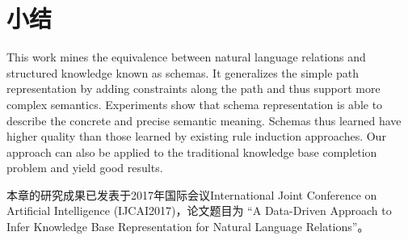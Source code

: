 \section{小结}
This work mines the equivalence between natural language relations and structured 
knowledge known as schemas.  It generalizes the simple path representation 
by adding constraints along the path and thus support more complex semantics.
Experiments show that schema representation is able to describe the concrete 
and precise semantic meaning. Schemas thus learned have higher quality than
those learned by existing rule induction approaches. Our approach can also be applied
to the traditional knowledge base completion problem and yield good results. 
%
%

本章的研究成果已发表于2017年国际会议International Joint Conference on Artificial Intelligence
(IJCAI2017)，论文题目为
``A Data-Driven Approach to Infer Knowledge Base Representation for Natural Language Relations''。
